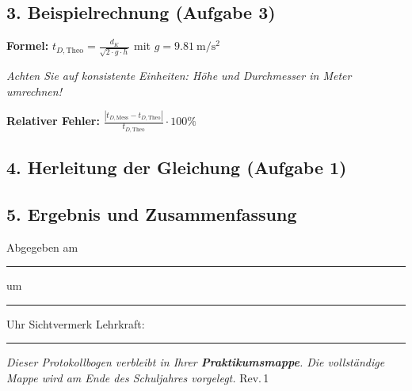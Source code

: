 \documentclass[11pt,a4paper]{scrartcl}
\begin{document}
	\vspace{0.5cm}
	
	
	
	
	\subsection*{3. Beispielrechnung (Aufgabe 3)}
	\begin{infobox}[title={\faIcon{info-circle} Berechnung der theoretischen Dunkelzeit}]
		\textbf{Formel:} \quad $\displaystyle t_{D,\text{Theo}} = \frac{d_K}{\sqrt{2 \cdot g \cdot h}}$ \quad mit $g = \SI{9,81}{\metre\per\second\squared}$
		
		\vspace{0.2cm}
		\textit{Achten Sie auf konsistente Einheiten: Höhe und Durchmesser in Meter umrechnen!}
		
		\vspace{0.2cm}
		\textbf{Relativer Fehler:} \quad $\displaystyle \frac{|t_{D,\text{Mess}} - t_{D,\text{Theo}}|}{t_{D,\text{Theo}}} \cdot 100\%$
	\end{infobox}
	\vspace{5cm}
	\subsection*{4. Herleitung der Gleichung (Aufgabe 1)}
	
	\vspace{6cm}
	
	\subsection*{5. Ergebnis und Zusammenfassung}
	
	\vspace{7cm}
	

	\vspace{0.4cm}
	\begin{tcolorbox}[colback=yellow!8, colframe=black, boxrule=0.6pt, title={\faIcon{check-circle}\enspace Abgabevermerk -- wird vor Ort ausgefüllt}, fonttitle=\bfseries]
		Abgegeben am \rule{2.8cm}{0.4pt} \enspace um \rule{2cm}{0.4pt} Uhr \hfill Sichtvermerk Lehrkraft: \rule{3.5cm}{0.4pt}

		\vspace{0.15cm}
		{\small\textit{Dieser Protokollbogen verbleibt in Ihrer \textbf{Praktikumsmappe}. Die vollständige Mappe wird am Ende des Schuljahres vorgelegt.} \hfill \scriptsize Rev.\,1}
	\end{tcolorbox}
\end{document}
